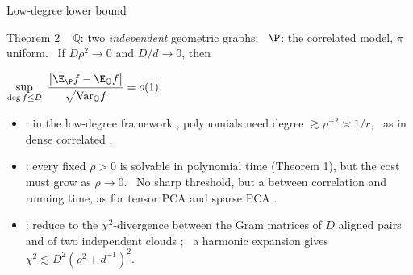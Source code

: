 \documentclass[aspectratio=169,10pt]{beamer}
\begin{document}
\begin{frame}{Low-degree lower bound}
\begin{kbox}{Theorem 2 \ }
$\mathbb Q$: two \emph{independent} geometric graphs; \ $\P$: the correlated model, $\pi$ uniform. \ If $D\rho^2\to0$ and $D/d\to0$, then
\par\vspace{1mm}
{\centering $\displaystyle\sup_{\deg f\le D}\ \frac{\big|\E_{\P}f-\E_{\mathbb Q}f\big|}{\sqrt{\mathrm{Var}_{\mathbb Q}f}}=o(1).$\par}
\end{kbox}
\vspace{1mm}
\begin{itemize}\setlength{\itemsep}{0.45em}
\item<2-> : in the low-degree framework , polynomials need degree $\gtrsim\rho^{-2}\asymp1/r$, \ as in dense correlated \ER {}.
\item<3-> : every fixed $\rho>0$ is solvable in polynomial time (Theorem 1), but the cost must grow as $\rho\to0$. \ No sharp threshold, but a  between correlation and running time, as for tensor PCA  and sparse PCA .
\item<4-> : reduce to the $\chi^2$-divergence between the Gram matrices of $D$ aligned pairs and of two independent clouds ; \ a harmonic expansion gives $\chi^2\lesssim D^2(\rho^2+d^{-1})^2$.
\end{itemize}
\end{frame}
\end{document}
